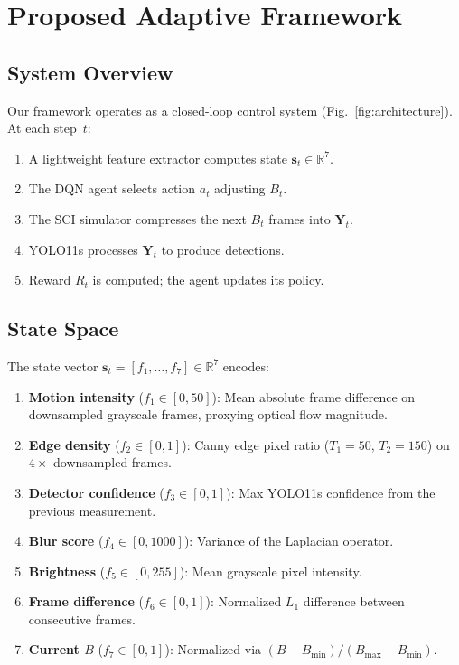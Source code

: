 \documentclass[10pt,journal]{IEEEtran}
\begin{document}
\FloatBarrier

\section{Proposed Adaptive Framework}

\subsection{System Overview}

Our framework operates as a closed-loop control system (Fig.~\ref{fig:architecture}). At each step~$t$:
\begin{enumerate}
    \item A lightweight feature extractor computes state $\mathbf{s}_t \in \mathbb{R}^7$.
    \item The DQN agent selects action $a_t$ adjusting $B_t$.
    \item The SCI simulator compresses the next $B_t$ frames into $\mathbf{Y}_t$.
    \item YOLO11s processes $\mathbf{Y}_t$ to produce detections.
    \item Reward $R_t$ is computed; the agent updates its policy.
\end{enumerate}

\subsection{State Space}
\label{sec:state}

The state vector $\mathbf{s}_t = [f_1, \ldots, f_7] \in \mathbb{R}^7$ encodes:

\begin{enumerate}
    \item \textbf{Motion intensity} ($f_1 \in [0, 50]$): Mean absolute frame difference on downsampled grayscale frames, proxying optical flow magnitude.
    \item \textbf{Edge density} ($f_2 \in [0, 1]$): Canny edge pixel ratio ($T_1{=}50$, $T_2{=}150$) on $4{\times}$ downsampled frames.
    \item \textbf{Detector confidence} ($f_3 \in [0, 1]$): Max YOLO11s confidence from the previous measurement.
    \item \textbf{Blur score} ($f_4 \in [0, 1000]$): Variance of the Laplacian operator.
    \item \textbf{Brightness} ($f_5 \in [0, 255]$): Mean grayscale pixel intensity.
    \item \textbf{Frame difference} ($f_6 \in [0, 1]$): Normalized $L_1$ difference between consecutive frames.
    \item \textbf{Current $B$} ($f_7 \in [0, 1]$): Normalized via $(B - B_{\min})/(B_{\max} - B_{\min})$.
\end{enumerate}
\end{document}
